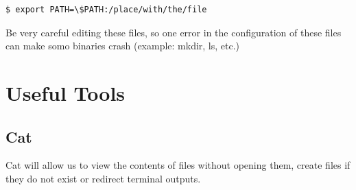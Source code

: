 \documentclass{article}
\newenvironment{blocktemplateIII}[1]{%
    \tcolorbox[beamer,%
    noparskip,breakable,
    ,colframe=Red,%
    colbacklower=LimeGreen!75!LightGreen,%
    title=#1]}%
    {\endtcolorbox}
\newenvironment{codetemplate}[1][]{%
  \mybasecolorbox[#1]
  \itshape
}{%
  \endmybasecolorbox
}
\begin{document}
\begin{codetemplate}{}
\begin{verbatim}
$ export PATH=\$PATH:/place/with/the/file
\end{verbatim}
\end{codetemplate}

\begin{blocktemplateIII}{Nota}
Be very careful editing these files, so one error in the configuration of these files can make somo binaries crash (example: mkdir, ls, etc.)
\end{blocktemplateIII}

\newpage
\section{Useful Tools}

\subsection{Cat}
Cat will allow us to view the contents of files without opening them, create files if they do not exist or redirect terminal outputs.
\end{document}

